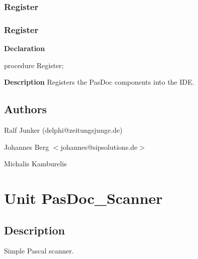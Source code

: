 \documentclass{report}
\newif\ifpdf
\begin{document}
\subsection*{\large{\textbf{Register}}\normalsize\hspace{1ex}\hrulefill}
\else
\subsection*{Register}
\fi
\label{PasDoc_Reg-Register}
\begin{list}{}{
\setlength{\itemindent}{0cm}
\setlength{\listparindent}{0cm}
\setlength{\leftmargin}{\evensidemargin}
\addtolength{\leftmargin}{\tmplength}
\settowidth{\labelsep}{X}
\addtolength{\leftmargin}{\labelsep}
\setlength{\labelwidth}{\tmplength}
}
\item[\textbf{Declaration}\hfill]
\ifpdf
\begin{flushleft}
\fi
\begin{ttfamily}
procedure Register;\end{ttfamily}

\ifpdf
\end{flushleft}
\fi

\par
\item[\textbf{Description}]
Registers the PasDoc components into the IDE.

\end{list}
\section{Authors}
\par
Ralf Junker (delphi@zeitungsjunge.de)

\par
Johannes Berg {$<$}johannes@sipsolutions.de{$>$}

\par
Michalis Kamburelis

\chapter{Unit PasDoc{\_}Scanner}
\label{PasDoc_Scanner}
\section{Description}
Simple Pascal scanner.\hfill\vspace*{1ex}
\end{document}
